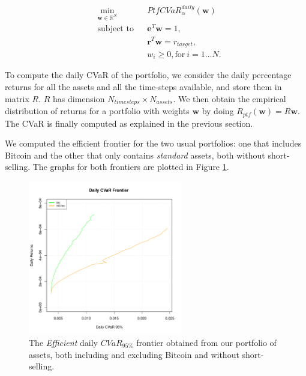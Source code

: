 \begin{subequations}
	\label{eq:general_opt_CVaR}
	\begin{align}
	&\!\min_{\mathbf{w}\in \mathbb{R}^{N}}     &    & PtfCVaR_\alpha^{daily}(\mathbf{w}) \\
	& \text{subject to}   &   & \mathbf{e}^T\mathbf{w} = 1 ,\\
	&                 &       & \mathbf{r}^T\mathbf{w} = r_{target},\label{eq:constraint2b} \\
	&		   &      & w_{i} \geq 0, \text{for} \: i = 1\dots N. 
	\end{align}
\end{subequations}

To compute the daily CVaR of the portfolio, we consider the daily percentage returns for all the assets and all the time-steps available, and store them in matrix $R$. $R$ has dimension $N_{timesteps} \times N_{assets}$. We then obtain the empirical distribution of returns for a portfolio with weights $\mathbf{w}$ by doing $R_{ptf}(\mathbf{w}) = R \mathbf{w} $. The CVaR is finally computed as explained in the previous section.

We computed the efficient frontier for the two usual portfolios: one that includes Bitcoin and the other that only contains \textit{standard} assets, both without short-selling. The graphs for both frontiers are plotted in Figure \ref{fig:cvar_efficient_frontier_comparison}.


\begin{figure}
	\centering
	\includegraphics[width=0.6\textwidth]{Images/efficient_frontier_CVaR.pdf}
	\caption[Efficient CVaR frontier comparison]{The \textit{Efficient} daily $CVaR_{95\%}$ frontier obtained from our portfolio of assets, both including and excluding Bitcoin and without short-selling.}
	\label{fig:cvar_efficient_frontier_comparison}
\end{figure}


